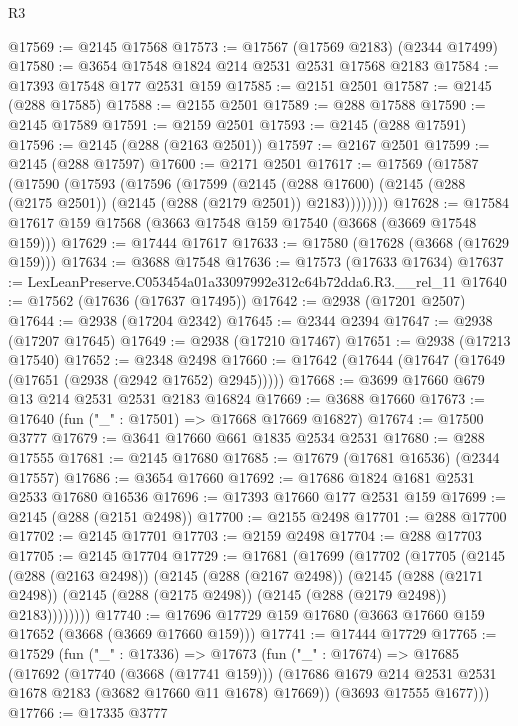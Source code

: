 \begin{lexlean}{R3}
\begin{coremodule}
@17569 := @2145 @17568
@17573 := @17567 (@17569 @2183) (@2344 @17499)
@17580 := @3654 @17548 @1824 @214 @2531 @2531 @17568 @2183
@17584 := @17393 @17548 @177 @2531 @159
@17585 := @2151 @2501
@17587 := @2145 (@288 @17585)
@17588 := @2155 @2501
@17589 := @288 @17588
@17590 := @2145 @17589
@17591 := @2159 @2501
@17593 := @2145 (@288 @17591)
@17596 := @2145 (@288 (@2163 @2501))
@17597 := @2167 @2501
@17599 := @2145 (@288 @17597)
@17600 := @2171 @2501
@17617 := @17569
    (@17587
      (@17590
        (@17593
          (@17596
            (@17599
              (@2145
                (@288 @17600)
                (@2145 (@288 (@2175 @2501)) (@2145 (@288 (@2179 @2501)) @2183))))))))
@17628 := @17584 @17617 @159 @17568 (@3663 @17548 @159 @17540 (@3668 (@3669 @17548 @159)))
@17629 := @17444 @17617
@17633 := @17580 (@17628 (@3668 (@17629 @159)))
@17634 := @3688 @17548
@17636 := @17573 (@17633 @17634)
@17637 := LexLeanPreserve.C053454a01a33097992e312c64b72dda6.R3.__rel_11
@17640 := @17562 (@17636 (@17637 @17495))
@17642 := @2938 (@17201 @2507)
@17644 := @2938 (@17204 @2342)
@17645 := @2344 @2394
@17647 := @2938 (@17207 @17645)
@17649 := @2938 (@17210 @17467)
@17651 := @2938 (@17213 @17540)
@17652 := @2348 @2498
@17660 := @17642 (@17644 (@17647 (@17649 (@17651 (@2938 (@2942 @17652) @2945)))))
@17668 := @3699 @17660 @679 @13 @214 @2531 @2531 @2183 @16824
@17669 := @3688 @17660
@17673 := @17640 (fun ("_" : @17501) => @17668 @17669 @16827)
@17674 := @17500 @3777
@17679 := @3641 @17660 @661 @1835 @2534 @2531
@17680 := @288 @17555
@17681 := @2145 @17680
@17685 := @17679 (@17681 @16536) (@2344 @17557)
@17686 := @3654 @17660
@17692 := @17686 @1824 @1681 @2531 @2533 @17680 @16536
@17696 := @17393 @17660 @177 @2531 @159
@17699 := @2145 (@288 (@2151 @2498))
@17700 := @2155 @2498
@17701 := @288 @17700
@17702 := @2145 @17701
@17703 := @2159 @2498
@17704 := @288 @17703
@17705 := @2145 @17704
@17729 := @17681
    (@17699
      (@17702
        (@17705
          (@2145
            (@288 (@2163 @2498))
            (@2145
              (@288 (@2167 @2498))
              (@2145
                (@288 (@2171 @2498))
                (@2145 (@288 (@2175 @2498)) (@2145 (@288 (@2179 @2498)) @2183))))))))
@17740 := @17696 @17729 @159 @17680 (@3663 @17660 @159 @17652 (@3668 (@3669 @17660 @159)))
@17741 := @17444 @17729
@17765 := @17529
    (fun ("_" : @17336) =>
    @17673
      (fun ("_" : @17674) =>
      @17685
        (@17692
          (@17740 (@3668 (@17741 @159)))
          (@17686 @1679 @214 @2531 @2531 @1678 @2183 (@3682 @17660 @11 @1678) @17669))
        (@3693 @17555 @1677)))
@17766 := @17335 @3777

\end{coremodule}
\end{lexlean}
